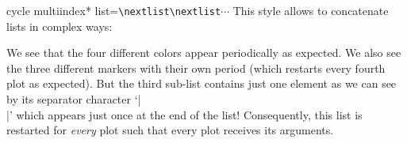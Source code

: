 \begin{pgfplotskey}{cycle multiindex* list=\texttt{\textbackslash nextlist}\texttt{\textbackslash nextlist}$\dotsb$}
	This style allows to concatenate lists in complex ways:
\begin{codeexample}[]
\end{codeexample}
	We see that the four different colors appear periodically as expected. We also see the three different markers with their own period (which restarts every fourth plot as expected). But the third sub-list contains just one element as we can see by its separator character `|\\|' which appears just once at the end of the list! Consequently, this list is restarted for \emph{every} plot such that every plot receives its arguments.
\end{pgfplotskey}

